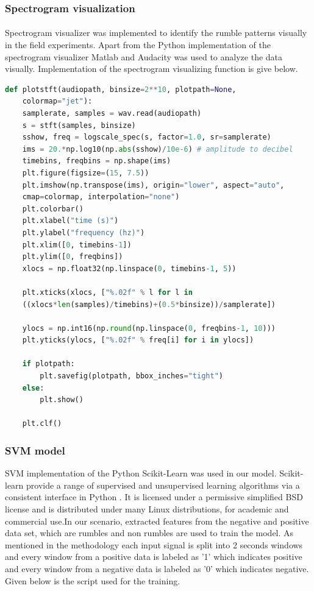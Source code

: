 \documentclass[12pt]{article}
\numberwithin{figure}{section}
\numberwithin{table}{section}
\begin{document}
\subsubsection{Spectrogram visualization}

\paragraph{}
Spectrogram visualizer was implemented to identify the rumble patterns visually in the field experiments. Apart from the Python implementation of the spectrogram visualizer Matlab and Audacity was used to analyze the data visually. Implementation of the spectrogram visualizing function is give below.

\begin{lstlisting}[language=Python]
def plotstft(audiopath, binsize=2**10, plotpath=None, 
	colormap="jet"):
    samplerate, samples = wav.read(audiopath)
    s = stft(samples, binsize)
    sshow, freq = logscale_spec(s, factor=1.0, sr=samplerate)
    ims = 20.*np.log10(np.abs(sshow)/10e-6) # amplitude to decibel
    timebins, freqbins = np.shape(ims)
    plt.figure(figsize=(15, 7.5))
    plt.imshow(np.transpose(ims), origin="lower", aspect="auto", 
    cmap=colormap, interpolation="none")
    plt.colorbar()
    plt.xlabel("time (s)")
    plt.ylabel("frequency (hz)")
    plt.xlim([0, timebins-1])
    plt.ylim([0, freqbins])
    xlocs = np.float32(np.linspace(0, timebins-1, 5))
    
    plt.xticks(xlocs, ["%.02f" % l for l in 
    ((xlocs*len(samples)/timebins)+(0.5*binsize))/samplerate])
    
    ylocs = np.int16(np.round(np.linspace(0, freqbins-1, 10)))
    plt.yticks(ylocs, ["%.02f" % freq[i] for i in ylocs])
    
    if plotpath:
        plt.savefig(plotpath, bbox_inches="tight")
    else:
        plt.show()
        
    plt.clf()
\end{lstlisting}


\newpage
\subsubsection{SVM model}
SVM implementation of the Python Scikit-Learn was used in our model. Scikit-learn provide a range of supervised and unsupervised learning algorithms via a consistent interface in Python \cite{41} . It is licensed under a permissive simplified BSD license and is distributed under many Linux distributions, for academic and commercial use.In our scenario, extracted features from the negative and positive data set, which are rumbles and non rumbles are used to train the model. As mentioned in the methodology each input signal is split into 2 seconds windows and every window from a positive data is labeled as '1' which indicates positive and every window from a negative data is labeled as '0' which indicates negative. Given below is the script used for the training.
\end{document}
